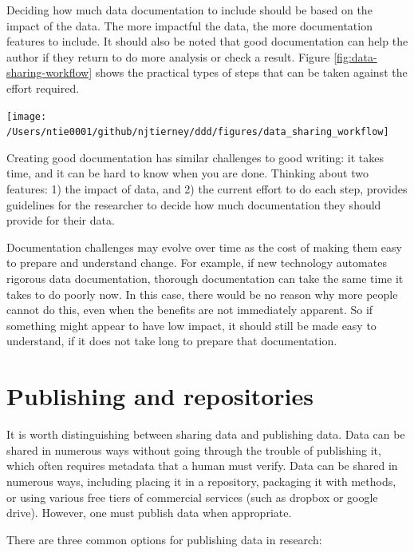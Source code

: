 \documentclass[
]{article}
\let\origfigure\figure
\let\endorigfigure\endfigure
\renewenvironment{figure}[1][2] {
    \expandafter\origfigure\expandafter[H]
} {
    \endorigfigure
}
\begin{document}
Deciding how much data documentation to include should be based on the impact of the data. The more impactful the data, the more documentation features to include. It should also be noted that good documentation can help the author if they return to do more analysis or check a result. Figure \ref{fig:data-sharing-workflow} shows the practical types of steps that can be taken against the effort required.

\begin{figure}
\texttt{[image: /Users/ntie0001/github/njtierney/ddd/figures/data\_sharing\_workflow]} \caption{The steps required compared to effort required for data sharing for reproducibility.}\label{fig:data-sharing-workflow}
\end{figure}

Creating good documentation has similar challenges to good writing: it takes time, and it can be hard to know when you are done. Thinking about two features: 1) the impact of data, and 2) the current effort to do each step, provides guidelines for the researcher to decide how much documentation they should provide for their data.

Documentation challenges may evolve over time as the cost of making them easy to prepare and understand change. For example, if new technology automates rigorous data documentation, thorough documentation can take the same time it takes to do poorly now. In this case, there would be no reason why more people cannot do this, even when the benefits are not immediately apparent. So if something might appear to have low impact, it should still be made easy to understand, if it does not take long to prepare that documentation.

\hypertarget{publish-repos}{%
\section{Publishing and repositories}\label{publish-repos}}

It is worth distinguishing between sharing data and publishing data. Data can be shared in numerous ways without going through the trouble of publishing it, which often requires metadata that a human must verify. Data can be shared in numerous ways, including placing it in a repository, packaging it with methods, or using various free tiers of commercial services (such as dropbox or google drive). However, one must publish data when appropriate.

There are three common options for publishing data in research:
\end{document}
